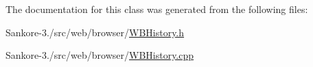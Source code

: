 The documentation for this class was generated from the following files\-:\begin{DoxyCompactItemize}
\item 
Sankore-\/3./src/web/browser/\hyperlink{_w_b_history_8h}{W\-B\-History.\-h}\item 
Sankore-\/3./src/web/browser/\hyperlink{_w_b_history_8cpp}{W\-B\-History.\-cpp}\end{DoxyCompactItemize}
